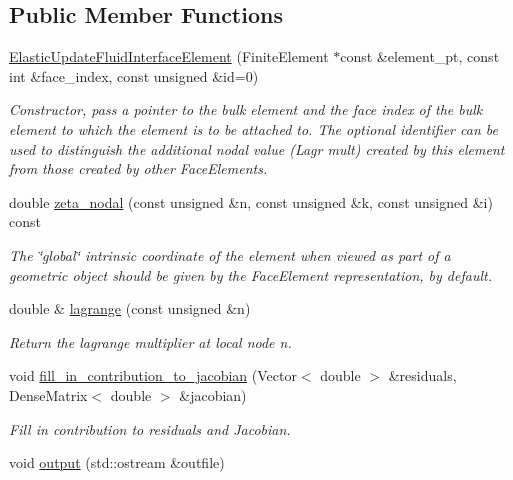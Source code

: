 \subsection*{Public Member Functions}
\begin{DoxyCompactItemize}
\item 
\hyperlink{classoomph_1_1ElasticUpdateFluidInterfaceElement_a5e5d81d8ba6c7b6567ec6d1dd42c1c96}{Elastic\+Update\+Fluid\+Interface\+Element} (Finite\+Element $\ast$const \&element\+\_\+pt, const int \&face\+\_\+index, const unsigned \&id=0)
\begin{DoxyCompactList}\small\item\em Constructor, pass a pointer to the bulk element and the face index of the bulk element to which the element is to be attached to. The optional identifier can be used to distinguish the additional nodal value (Lagr mult) created by this element from those created by other Face\+Elements. \end{DoxyCompactList}\item 
double \hyperlink{classoomph_1_1ElasticUpdateFluidInterfaceElement_a41706192ce4de3c4c51a70086199d8fa}{zeta\+\_\+nodal} (const unsigned \&n, const unsigned \&k, const unsigned \&i) const
\begin{DoxyCompactList}\small\item\em The \char`\"{}global\char`\"{} intrinsic coordinate of the element when viewed as part of a geometric object should be given by the Face\+Element representation, by default. \end{DoxyCompactList}\item 
double \& \hyperlink{classoomph_1_1ElasticUpdateFluidInterfaceElement_a8b5c5b703e6daafbe1dcafd3fe93e537}{lagrange} (const unsigned \&n)
\begin{DoxyCompactList}\small\item\em Return the lagrange multiplier at local node n. \end{DoxyCompactList}\item 
void \hyperlink{classoomph_1_1ElasticUpdateFluidInterfaceElement_acc1d5bb57e5664b86a9a76a4cfb8259f}{fill\+\_\+in\+\_\+contribution\+\_\+to\+\_\+jacobian} (Vector$<$ double $>$ \&residuals, Dense\+Matrix$<$ double $>$ \&jacobian)
\begin{DoxyCompactList}\small\item\em Fill in contribution to residuals and Jacobian. \end{DoxyCompactList}\item 
void \hyperlink{classoomph_1_1ElasticUpdateFluidInterfaceElement_a46b22d178b248355083a3564e4e92eb0}{output} (std\+::ostream \&outfile)

\end{DoxyCompactItemize}
